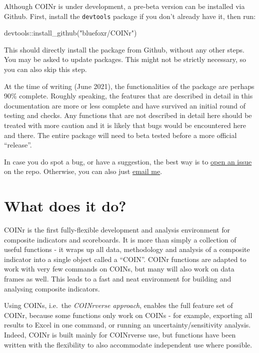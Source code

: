\documentclass[
]{book}
\newenvironment{Shaded}{\begin{snugshade}}{\end{snugshade}}
\newcommand{\FunctionTok}[1]{\textcolor[rgb]{0.00,0.00,0.00}{#1}}
\newcommand{\NormalTok}[1]{#1}
\newcommand{\SpecialCharTok}[1]{\textcolor[rgb]{0.00,0.00,0.00}{#1}}
\newcommand{\StringTok}[1]{\textcolor[rgb]{0.31,0.60,0.02}{#1}}
\begin{document}
Although COINr is under development, a pre-beta version can be installed via Github. First, install the \texttt{devtools} package if you don't already have it, then run:

\begin{Shaded}
\begin{Highlighting}[]
\NormalTok{devtools}\SpecialCharTok{::}\FunctionTok{install\_github}\NormalTok{(}\StringTok{"bluefoxr/COINr"}\NormalTok{)}
\end{Highlighting}
\end{Shaded}

This should directly install the package from Github, without any other steps. You may be asked to update packages. This might not be strictly necessary, so you can also skip this step.

At the time of writing (June 2021), the functionalities of the package are perhaps 90\% complete. Roughly speaking, the features that are described in detail in this documentation are more or less complete and have survived an initial round of testing and checks. Any functions that are not described in detail here should be treated with more caution and it is likely that bugs would be encountered here and there. The entire package will need to beta tested before a more official ``release''.

In case you do spot a bug, or have a suggestion, the best way is to \href{https://github.com/bluefoxr/COINr/issues}{open an issue} on the repo. Otherwise, you can also just \href{mailto:william.becker@bluefoxdata.eu}{email me}.

\hypertarget{what-does-it-do}{%
\section{What does it do?}\label{what-does-it-do}}

COINr is the first fully-flexible development and analysis environment for composite indicators and scoreboards. It is more than simply a collection of useful functions - it wraps up all data, methodology and analysis of a composite indicator into a single object called a ``COIN''. COINr functions are adapted to work with very few commands on COINs, but many will also work on data frames as well. This leads to a fast and neat environment for building and analysing composite indicators.

Using COINs, i.e.~the \emph{COINrverse approach}, enables the full feature set of COINr, because some functions only work on COINs - for example, exporting all results to Excel in one command, or running an uncertainty/sensitivity analysis. Indeed, COINr is built mainly for COINrverse use, but functions have been written with the flexibility to also accommodate independent use where possible.
\end{document}
